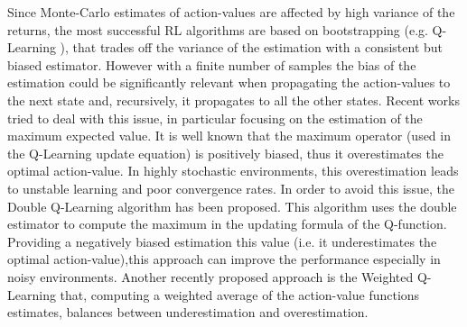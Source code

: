 \documentclass[conference]{IEEEtran}
\begin{document}
Since Monte-Carlo estimates of action-values are affected by high variance of the returns, the most successful RL algorithms are based on bootstrapping (e.g. Q-Learning \cite{watkins1992q}), that trades off the variance of the estimation with a consistent but biased estimator. However with a finite number of samples the bias of the estimation could be significantly relevant when propagating the action-values to the next state and, recursively, it propagates to all the other states. Recent works tried to deal with this issue, in particular focusing on the estimation of the maximum expected value. 
It is well known \cite{smith2006optimizer, van2004rational} that the maximum operator (used in the Q-Learning update equation) is positively biased, thus it overestimates the optimal action-value. In highly stochastic environments, this overestimation leads to unstable learning and poor convergence rates. In order to avoid this issue, the Double Q-Learning algorithm \cite{van2010double} has been proposed. This algorithm uses the double estimator \cite{van2013estimating} to compute the maximum in the updating formula of the Q-function. Providing a negatively biased estimation this value (i.e. it underestimates the optimal action-value),this approach can improve the performance especially in noisy environments.
Another recently proposed approach is the Weighted Q-Learning \cite{d2016estimating} that, computing a weighted average of the action-value functions estimates, balances between underestimation and overestimation. 
\end{document}
